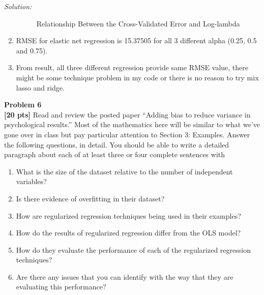 \documentclass{article}
\newenvironment{problem}[2][Problem]
    { \begin{mdframed}[backgroundcolor=gray!20] \textbf{#1 #2} \\}
    {  \end{mdframed}}
\newenvironment{solution}
    {\textit{Solution:}}
    {}
\begin{document}
\begin{solution}
\begin{enumerate}
\begin{figure}[h]
		\caption{Relationship Between the Cross-Validated Error and Log-lambda}
	\end{figure}	
	\item \mbox{}
	RMSE for elastic net regression is 15.37505 for all 3 different alpha (0.25, 0.5 and 0.75).
	\item \mbox{}
	From result, all three different regression provide same RMSE value, there might be some technique problem in my code or there is no reason to try mix lasso and ridge.
\end{enumerate}
\end{solution}

\newpage
\begin{problem}{6}
\textbf{[20 pts]}
Read and review the posted paper “Adding bias to reduce variance in psychological results.” Most of the mathematics here will be similar to what we’ve gone over in class but pay particular attention to Section 3: Examples. Answer the following questions, in detail. You should be able to write a detailed paragraph about each of at least three or four complete sentences with
\begin{enumerate}
	\item What is the size of the dataset relative to the number of independent variables?
	\item Is there evidence of overfitting in their dataset?
	\item How are regularized regression techniques being used in their examples?
	\item How do the results of regularized regression differ from the OLS model?
	\item How do they evaluate the performance of each of the regularized regression techniques?
	\item Are there any issues that you can identify with the way that they are evaluating this
performance?
\end{enumerate}
\end{problem}
\end{document}

